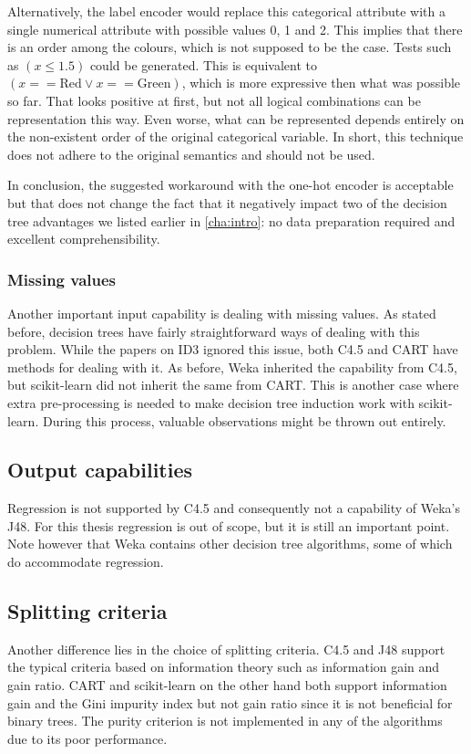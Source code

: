 Alternatively, the label encoder would replace this categorical attribute with a single numerical attribute with possible values 0, 1 and 2. This implies that there is an order among the colours, which is not supposed to be the case. Tests such as $(x \leqslant 1.5)$ could be generated. This is equivalent to $(x == \text{Red} \lor x == \text{Green})$, which is more expressive then what was possible so far. That looks positive at first, but not all logical combinations can be representation this way. Even worse, what can be represented depends entirely on the non-existent order of the original categorical variable. In short, this technique does not adhere to the original semantics and should not be used.

In conclusion, the suggested workaround with the one-hot encoder is acceptable but that does not change the fact that it negatively impact two of the decision tree advantages we listed earlier in \autoref{cha:intro}: no data preparation required and excellent comprehensibility.

\subsubsection{Missing values}
Another important input capability is dealing with missing values. As stated before, decision trees have fairly straightforward ways of dealing with this problem. While the papers on ID3 ignored this issue, both C4.5 and CART have methods for dealing with it. As before, Weka inherited the capability from C4.5, but scikit-learn did not inherit the same from CART. This is another case where extra pre-processing is needed to make decision tree induction work with scikit-learn. During this process, valuable observations might be thrown out entirely.

\subsection{Output capabilities}
Regression is not supported by C4.5 and consequently not a capability of Weka's J48. For this thesis regression is out of scope, but it is still an important point. Note however that Weka contains other decision tree algorithms, some of which do accommodate regression.


\subsection{Splitting criteria}
Another difference lies in the choice of splitting criteria. C4.5 and J48 support the typical criteria based on information theory such as information gain and gain ratio. CART and scikit-learn on the other hand both support information gain and the Gini impurity index but not gain ratio since it is not beneficial for binary trees. The purity criterion is not implemented in any of the algorithms due to its poor performance.


